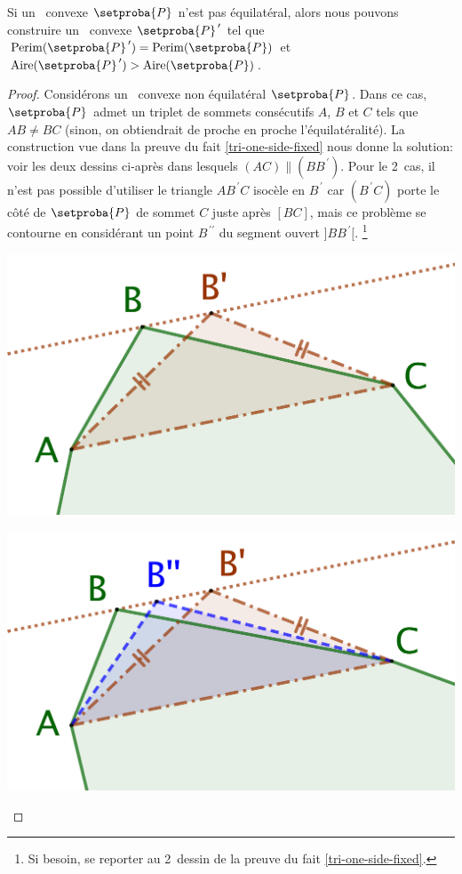 

\begin{fact} \label{must-be-equi}
	Si un \ngone\ convexe $\setproba{P}$ n'est pas équilatéral,
	alors nous pouvons construire un \ngone\ convexe $\primeit{\setproba{P}}$ tel que
	$\perim{\primeit{\setproba{P}}} = \perim{\setproba{P}}$
	et
	$\area{\primeit{\setproba{P}}} > \area{\setproba{P}}$.
\end{fact}


\begin{proof}
	Considérons un \ngone\ convexe non équilatéral $\setproba{P}$.
	Dans ce cas, $\setproba{P}$ admet un triplet de sommets consécutifs $A$, $B$ et $C$ tels que $AB \neq BC$
	(sinon, on obtiendrait de proche en proche l'équilatéralité).
	La construction vue dans la preuve du fait \ref{tri-one-side-fixed} nous donne la solution: voir les deux dessins ci-après dans lesquels $(AC) \parallel (BB^{\,\prime})$.
	Pour le 2\ieme\ cas, il n'est pas possible d'utiliser le triangle $AB^{\,\prime}C$ isocèle en $B^{\,\prime}$ car $(B^{\,\prime}C)$ porte le côté de $\setproba{P}$ de sommet $C$ juste après $[BC]$, mais ce problème se contourne en considérant un point $B^{\,\prime\prime}$ du segment ouvert $]BB^{\,\prime}[$.%
	\footnote{
	    Si besoin, se reporter au 2\ieme\ dessin de la preuve du fait \ref{tri-one-side-fixed}.
	}
	\begin{multicols}{2}
		\centering

		\includegraphics[scale=.4]{content/polygon/sol-must-be/not-iso-OK.png}

		\includegraphics[scale=.4]{content/polygon/sol-must-be/not-iso-KO.png}
	\end{multicols}


\end{proof}
